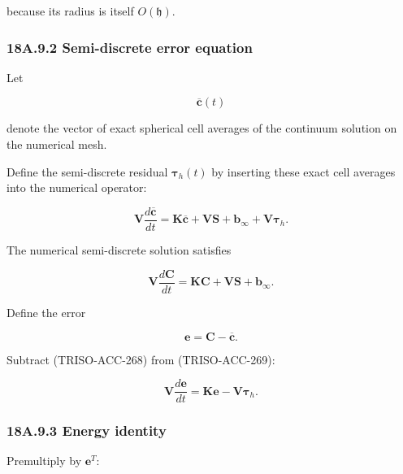 \documentclass[11pt,a4paper]{article}
\begin{document}
because its radius is itself $O(\mathfrak h)$.

\subsubsection*{18A.9.2 Semi-discrete error equation}

Let

\begin{equation}
\overline{\mathbf c}(t)
\tag{TRISO-ACC-267}
\label{eq:triso-acc-267}
\end{equation}

denote the vector of exact spherical cell averages of the continuum solution on the numerical mesh.

Define the semi-discrete residual $\boldsymbol\tau_h(t)$ by inserting these exact cell averages into the numerical operator:

\begin{equation}
\boxed{
\mathbf V
\frac{d\overline{\mathbf c}}{dt}
=
\mathbf K\overline{\mathbf c}
+
\mathbf V\mathbf S
+
\mathbf b_\infty
+
\mathbf V\boldsymbol\tau_h.
}
\tag{TRISO-ACC-268}
\label{eq:triso-acc-268}
\end{equation}

The numerical semi-discrete solution satisfies

\begin{equation}
\mathbf V
\frac{d\mathbf C}{dt}
=
\mathbf K\mathbf C
+
\mathbf V\mathbf S
+
\mathbf b_\infty.
\tag{TRISO-ACC-269}
\label{eq:triso-acc-269}
\end{equation}

Define the error

\begin{equation}
\boxed{
\mathbf e
=
\mathbf C-\overline{\mathbf c}.
}
\tag{TRISO-ACC-270}
\label{eq:triso-acc-270}
\end{equation}

Subtract (TRISO-ACC-268) from (TRISO-ACC-269):

\begin{equation}
\mathbf V
\frac{d\mathbf e}{dt}
=
\mathbf K\mathbf e
-
\mathbf V\boldsymbol\tau_h.
\tag{TRISO-ACC-271}
\label{eq:triso-acc-271}
\end{equation}

\subsubsection*{18A.9.3 Energy identity}

Premultiply by $\mathbf e^T$:
\end{document}
